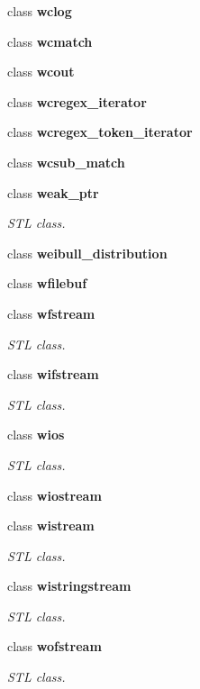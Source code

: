 \begin{DoxyCompactItemize}
\item 
class \textbf{ wclog}
\item 
class \textbf{ wcmatch}
\item 
class \textbf{ wcout}
\item 
class \textbf{ wcregex\+\_\+iterator}
\item 
class \textbf{ wcregex\+\_\+token\+\_\+iterator}
\item 
class \textbf{ wcsub\+\_\+match}
\item 
class \textbf{ weak\+\_\+ptr}
\begin{DoxyCompactList}\small\item\em S\+TL class. \end{DoxyCompactList}\item 
class \textbf{ weibull\+\_\+distribution}
\item 
class \textbf{ wfilebuf}
\item 
class \textbf{ wfstream}
\begin{DoxyCompactList}\small\item\em S\+TL class. \end{DoxyCompactList}\item 
class \textbf{ wifstream}
\begin{DoxyCompactList}\small\item\em S\+TL class. \end{DoxyCompactList}\item 
class {\bfseries wios}
\begin{DoxyCompactList}\small\item\em S\+TL class. \end{DoxyCompactList}\item 
class \textbf{ wiostream}
\item 
class \textbf{ wistream}
\begin{DoxyCompactList}\small\item\em S\+TL class. \end{DoxyCompactList}\item 
class \textbf{ wistringstream}
\begin{DoxyCompactList}\small\item\em S\+TL class. \end{DoxyCompactList}\item 
class \textbf{ wofstream}
\begin{DoxyCompactList}\small\item\em S\+TL class. \end{DoxyCompactList}\item 

\end{DoxyCompactItemize}
